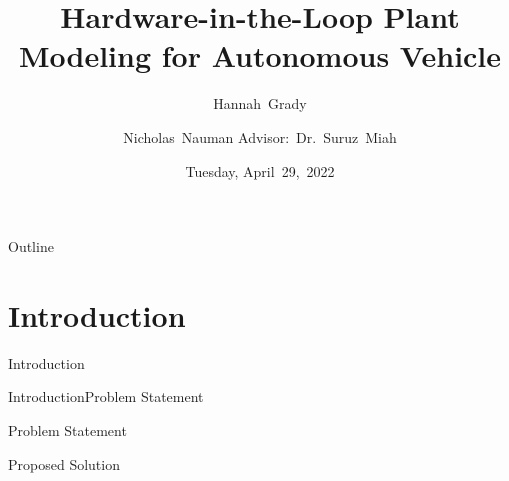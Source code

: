 \documentclass{beamer}
\title[HIL Plant Modeling]{Hardware-in-the-Loop Plant Modeling for Autonomous Vehicle}
\author[H.~Grady, N.~Nauman]{Hannah~Grady \and Nicholas~Nauman 
\linebreak Advisor:~Dr.~Suruz~Miah}
\institute[Bradley University] %
{
  Department of Electrical and Computer Engineering\\
  Bradley University\\
  1501 W. Bradley Avenue\\
  Peoria, IL, 61625, USA
}
\date[April~29,~2022]{Tuesday, April~29,~2022}
\begin{document}
\begin{frame}
  \titlepage
\end{frame}

\begin{frame}{Outline} 
  \tableofcontents%
\end{frame}

\section{Introduction}

\begin{frame}{Introduction}{}

\end{frame}

\begin{frame}{Introduction}{Problem Statement}
  \begin{block}{Problem Statement}
    \begin{LARGE}
      
    \end{LARGE}
  \end{block}
  \pause
  \begin{block}{Proposed Solution}
    \begin{LARGE}
      
    \end{LARGE}
  \end{block}
\end{frame}




%
%
\end{document}
